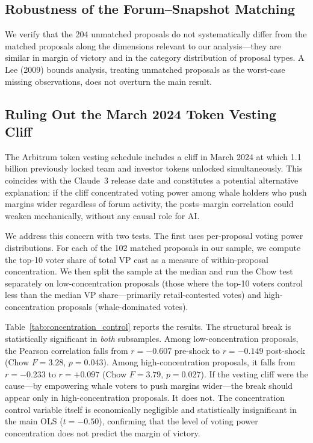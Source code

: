 \documentclass[12pt]{article}
\begin{document}
\subsection{Robustness of the Forum--Snapshot Matching}

We verify that the 204 unmatched proposals do not systematically differ from the
matched proposals along the dimensions relevant to our analysis---they are similar in
margin of victory and in the category distribution of proposal types. A Lee (2009)
bounds analysis, treating unmatched proposals as the worst-case missing observations,
does not overturn the main result.

\subsection{Ruling Out the March 2024 Token Vesting Cliff}
\label{sec:vesting}

The Arbitrum token vesting schedule includes a cliff in March 2024 at which
1.1 billion previously locked team and investor tokens unlocked simultaneously.
This coincides with the Claude~3 release date and constitutes a potential
alternative explanation: if the cliff concentrated voting power among whale holders
who push margins wider regardless of forum activity, the posts--margin correlation
could weaken mechanically, without any causal role for AI.

We address this concern with two tests. The first uses per-proposal voting power
distributions. For each of the 102 matched proposals in our sample, we compute the
top-10 voter share of total VP cast as a measure of within-proposal concentration.
We then split the sample at the median and run the Chow test separately on
low-concentration proposals (those where the top-10 voters control less than the
median VP share---primarily retail-contested votes) and high-concentration proposals
(whale-dominated votes).

Table~\ref{tab:concentration_control} reports the results. The structural break is
statistically significant in \emph{both} subsamples. Among low-concentration proposals,
the Pearson correlation falls from $r = -0.607$ pre-shock to $r = -0.149$ post-shock
(Chow $F = 3.28$, $p = 0.043$). Among high-concentration proposals, it falls from
$r = -0.233$ to $r = +0.097$ (Chow $F = 3.79$, $p = 0.027$). If the vesting cliff
were the cause---by empowering whale voters to push margins wider---the break should
appear only in high-concentration proposals. It does not. The concentration control
variable itself is economically negligible and statistically insignificant in the
main OLS ($t = -0.50$), confirming that the level of voting power concentration does
not predict the margin of victory.
\end{document}
